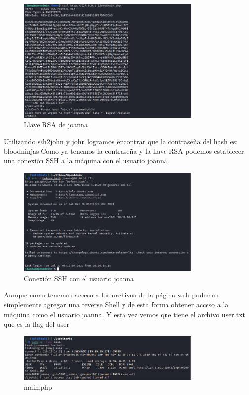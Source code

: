 \documentclass{article}
\begin{document}
\begin{figure}[H]
	\center
	\includegraphics[width=0.8\textwidth]{images/openadmin/15-joannarsa.png}
	\caption{Llave RSA de joanna}
\end{figure}

Utilizando ssh2john y john logramos encontrar que la contraseña del hash es: bloodninjas
Como ya tenemos la contraseña y la llave RSA podemos establecer una conexión SSH a la máquina con el usuario joanna.
\begin{figure}[H]
	\center
	\includegraphics[width=0.8\textwidth]{images/openadmin/16-sshjoanna.png}
	\caption{Conexión SSH con el usuario joanna}
\end{figure}

Aunque como tenemos acceso a los archivos de la página web podemos simplemente agregar una reverse Shell y de esta forma obtener acceso a la máquina como el usuario joanna. Y esta vez vemos que tiene el archivo user.txt que es la flag del user
\begin{figure}[H]
	\center
	\includegraphics[width=0.8\textwidth]{images/openadmin/17-alternativa.png}
	\caption{main.php}
\end{figure}
\end{document}
